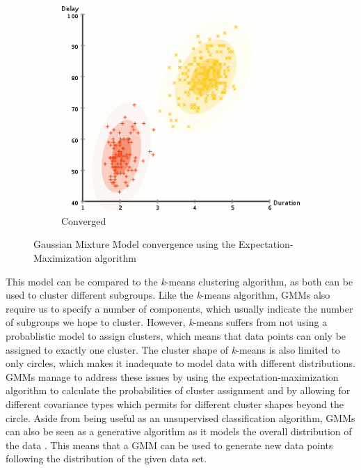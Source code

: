 \documentclass
[
    a4paper,
    twoside,
    12pt,
]
{report}
\begin{document}
\begin{figure}
\begin{subfigure}[b]{0.3\textwidth}
         \label{fig:gmm-mid}
   \end{subfigure}
   \quad
   \begin{subfigure}[b]{0.3\textwidth}
      \includegraphics[width=\textwidth]{img/em-alg4.jpg}
         \caption{Converged}
         \label{fig:gmm-conv}
   \end{subfigure}
   \quad
   \caption{Gaussian Mixture Model convergence using the Expectation-Maximization algorithm}\label{fig:em-converge}
\end{figure}

This model can be compared to the \emph{k}-means clustering algorithm,
as both can be used to cluster different subgroups. Like the
\emph{k}-means algorithm, GMMs also require us to specify a number of
components, which usually indicate the number of subgroups we hope to
cluster. However, \emph{k}-means suffers from not using a probablistic
model to assign clusters, which means that data points can only be
assigned to exactly one cluster. The cluster shape of \emph{k}-means is
also limited to only circles, which makes it inadequate to model data
with different distributions. GMMs manage to address these issues by
using the expectation-maximization algorithm to calculate the
probabilities of cluster assignment and by allowing for different
covariance types which permits for different cluster shapes beyond the
circle. Aside from being useful as an unsupervised classification
algorithm, GMMs can also be seen as a generative algorithm as it models
the overall distribution of the data \parencite{mcgonagle2016}. This
means that a GMM can be used to generate new data points following the
distribution of the given data set.
\end{document}
